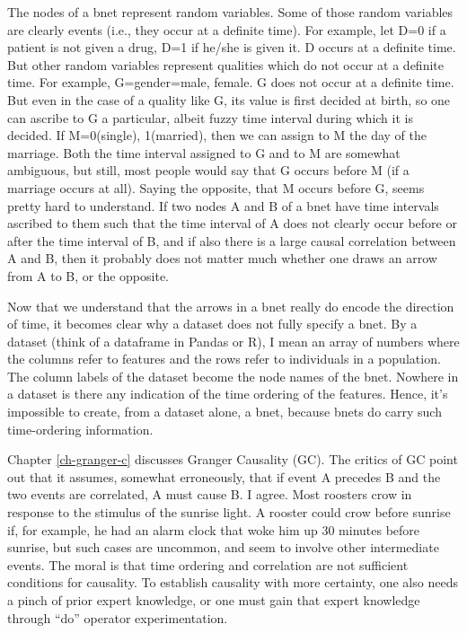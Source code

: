 The nodes of a bnet represent random variables. Some of those
random variables are clearly events (i.e., they occur at a definite time).
For example, let D=0 if a patient is not given a drug, D=1 if he/she is given
it. D occurs at a definite time. But other random variables represent
qualities which do not occur at a definite time. For example,
G=gender=male, female. G does not occur at a definite time.  But even in the
case of a quality like G, its value is first decided at birth, so one can
ascribe to G a particular, albeit fuzzy time interval during which it is
decided. If M=0(single), 1(married), then we can assign to M the day of the
marriage. Both the time interval assigned to G and to  M are somewhat
ambiguous, but still, most people would say that G occurs before M (if a
marriage occurs at all). Saying the opposite, that M occurs before G, seems
pretty hard to understand. If two nodes A and B of a bnet have time intervals
ascribed to them such that the time interval of A does not clearly occur
before or after the time interval of B, and if also there is a large causal
correlation between A and B, then it probably does not matter
much whether one draws an arrow from A to B, or the opposite.

Now that we understand that the arrows in a bnet really do encode the
direction of time, it becomes clear why a dataset does not fully specify a
bnet. By a dataset (think of a dataframe in Pandas or R), I mean an array of
numbers where the columns refer to features and the rows refer to individuals
in a population. The column labels of the dataset become the node names of
the bnet. Nowhere in a dataset is there any indication of the time ordering
of the features. Hence, it’s impossible to create, from a dataset alone, a
bnet, because bnets do carry such time-ordering information.

Chapter \ref{ch-granger-c} discusses
 Granger Causality
(GC). The critics of GC point out that it assumes, somewhat erroneously,
that if event A precedes B and the two events are correlated, A must
cause B. I agree. Most roosters crow in response to the stimulus of the
sunrise light.  A rooster could crow before sunrise if,  for example,  he
had an alarm clock that woke him up 30 minutes before sunrise, but such cases
are uncommon, and seem to involve other intermediate events.  The moral is
that time ordering and correlation are not sufficient
conditions for causality. To establish causality with more certainty, one
also needs a pinch of prior expert knowledge, or one must gain that expert
knowledge through ``do” operator experimentation.



